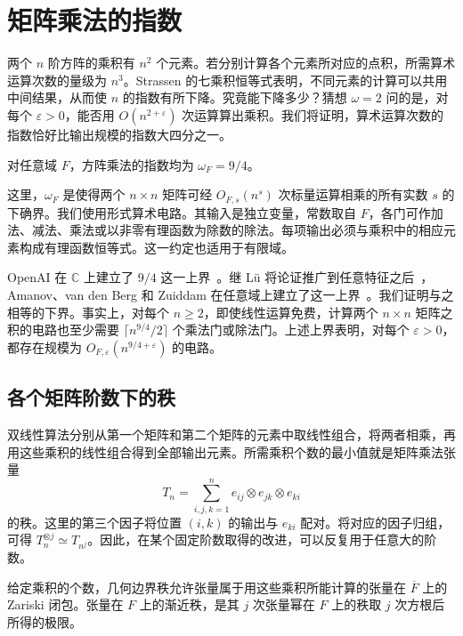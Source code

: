 \section{矩阵乘法的指数}\label{sec:intro}

两个 \(n\) 阶方阵的乘积有 \(n^2\) 个元素。若分别计算各个元素所对应的点积，所需算术运算次数的量级为 \(n^3\)。Strassen 的七乘积恒等式表明，不同元素的计算可以共用中间结果，从而使 \(n\) 的指数有所下降。究竟能下降多少？猜想 \(\omega=2\) 问的是，对每个 \(\varepsilon>0\)，能否用 \(O(n^{2+\varepsilon})\) 次运算算出乘积。我们将证明，算术运算次数的指数恰好比输出规模的指数大四分之一。

\begin{theorem}\label{thm:square}
对任意域 \(F\)，方阵乘法的指数均为 \(\omega_F=9/4\)。
\end{theorem}

这里，\(\omega_F\) 是使得两个 \(n\times n\) 矩阵可经 \(O_{F,s}(n^s)\) 次标量运算相乘的所有实数 \(s\) 的下确界。我们使用形式算术电路。其输入是独立变量，常数取自 \(F\)，各门可作加法、减法、乘法或以非零有理函数为除数的除法。每项输出必须与乘积中的相应元素构成有理函数恒等式。这一约定也适用于有限域。

OpenAI 在 \(\mathbb C\) 上建立了 \(9/4\) 这一上界~\cite{nine}。继 L\"u 将论证推广到任意特征之后~\cite{lu}，Amanov、van den Berg 和 Zuiddam 在任意域上建立了这一上界~\cite{abvz}。我们证明与之相等的下界。事实上，对每个 \(n\ge2\)，即使线性运算免费，计算两个 \(n\times n\) 矩阵之积的电路也至少需要 \(\lceil n^{9/4}/2\rceil\) 个乘法门或除法门。上述上界表明，对每个 \(\varepsilon>0\)，都存在规模为 \(O_{F,\varepsilon}(n^{9/4+\varepsilon})\) 的电路。

\par{}
\subsection{各个矩阵阶数下的秩}

双线性算法分别从第一个矩阵和第二个矩阵的元素中取线性组合，将两者相乘，再用这些乘积的线性组合得到全部输出元素。所需乘积个数的最小值就是矩阵乘法张量
\[
             T_n=\sum_{i,j,k=1}^{n}
                    e_{ij}\otimes e_{jk}\otimes e_{ki}
\]
的秩。这里的第三个因子将位置 \((i,k)\) 的输出与 \(e_{ki}\) 配对。将对应的因子归组，可得 \(T_n^{\otimes j}\simeq T_{n^j}\)。因此，在某个固定阶数取得的改进，可以反复用于任意大的阶数。

给定乘积的个数，几何边界秩允许张量属于用这些乘积所能计算的张量在 \(\overline F\) 上的 Zariski 闭包。张量在 \(F\) 上的渐近秩，是其 \(j\) 次张量幂在 \(F\) 上的秩取 \(j\) 次方根后所得的极限。

